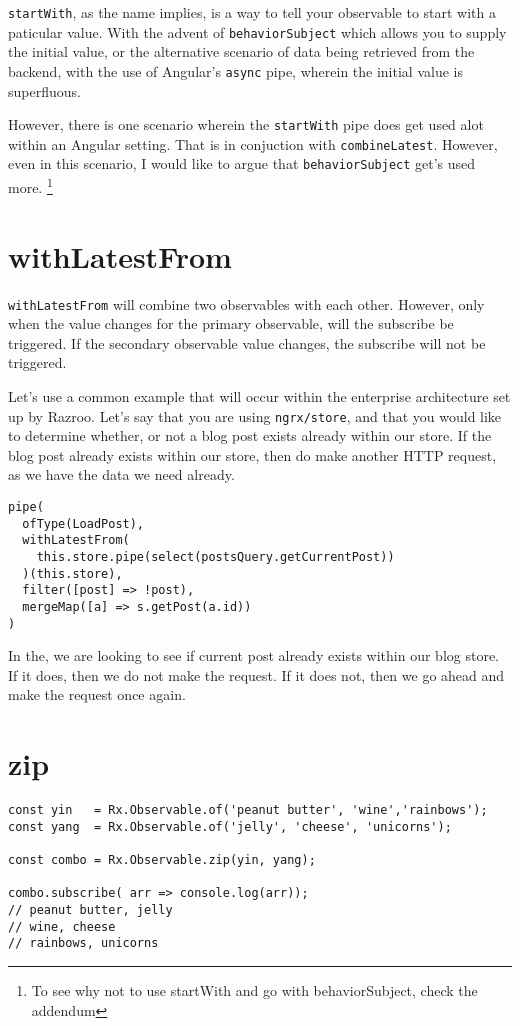 \lstinline{startWith}, as the name implies, is a way to tell your observable 
to start with a paticular value. With the advent of \lstinline{behaviorSubject}
which allows you to supply the initial value, or the alternative scenario 
of data being retrieved from the backend, with the use of Angular's 
\lstinline{async} pipe, wherein the initial value is superfluous. 

However, there is one scenario wherein the \lstinline{startWith} pipe does get
used alot within an Angular setting. That is in conjuction with 
\lstinline{combineLatest}. However, even in this scenario, I would like to argue
that \lstinline{behaviorSubject} get's used more. \footnote{To see why not to 
use startWith and go with behaviorSubject, check the addendum}

\section{withLatestFrom}
\lstinline{withLatestFrom} will combine two observables with each other. However,
only when the value changes for the primary observable, will the subscribe be 
triggered. If the secondary observable value changes, the subscribe will not be 
triggered. 

Let's use a common example that will occur within the enterprise architecture 
set up by Razroo. Let's say that you are using \lstinline{ngrx/store}, and
that you would like to determine whether, or not a blog post exists already
within our store. If the blog post already exists within our store, then do
make another HTTP request, as we have the data we need already. 

\begin{lstlisting}[caption=data-access-post.ts]
pipe(
  ofType(LoadPost),
  withLatestFrom(
    this.store.pipe(select(postsQuery.getCurrentPost))
  )(this.store),
  filter([post] => !post),
  mergeMap([a] => s.getPost(a.id))
)
\end{lstlisting}

In the, we are looking to see if current post already exists within our blog 
store. If it does, then we do not make the request. If it does not, then 
we go ahead and make the request once again. 

\section{zip}

\begin{lstlisting}[caption=yin-yang.component.ts]
const yin   = Rx.Observable.of('peanut butter', 'wine','rainbows');
const yang  = Rx.Observable.of('jelly', 'cheese', 'unicorns');

const combo = Rx.Observable.zip(yin, yang);

combo.subscribe( arr => console.log(arr));
// peanut butter, jelly
// wine, cheese
// rainbows, unicorns  
\end{lstlisting}


